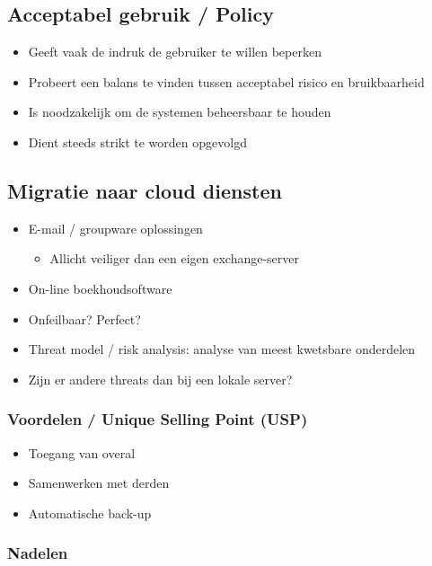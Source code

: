 \documentclass{article}
\begin{document}
\subsection{Acceptabel gebruik / Policy}

\begin{itemize}
    \item Geeft vaak de indruk de gebruiker te willen beperken
    \item Probeert een balans te vinden tussen acceptabel risico en bruikbaarheid
    \item Is noodzakelijk om de systemen beheersbaar te houden
    \item Dient steeds strikt te worden opgevolgd
\end{itemize}

\subsection{Migratie naar cloud diensten}

\begin{itemize}
    \item E-mail / groupware oplossingen
    \begin{itemize}
        \item Allicht veiliger dan een eigen exchange-server
    \end{itemize}
    \item On-line boekhoudsoftware
    \item Onfeilbaar? Perfect? 
    \item Threat model / risk analysis: analyse van meest kwetsbare onderdelen
    \item Zijn er andere threats dan bij een lokale server?
\end{itemize}

\subsubsection{Voordelen / Unique Selling Point (USP)}

\begin{itemize}
    \item Toegang van overal
    \item Samenwerken met derden
    \item Automatische back-up
\end{itemize}

\subsubsection{Nadelen}
\end{document}
